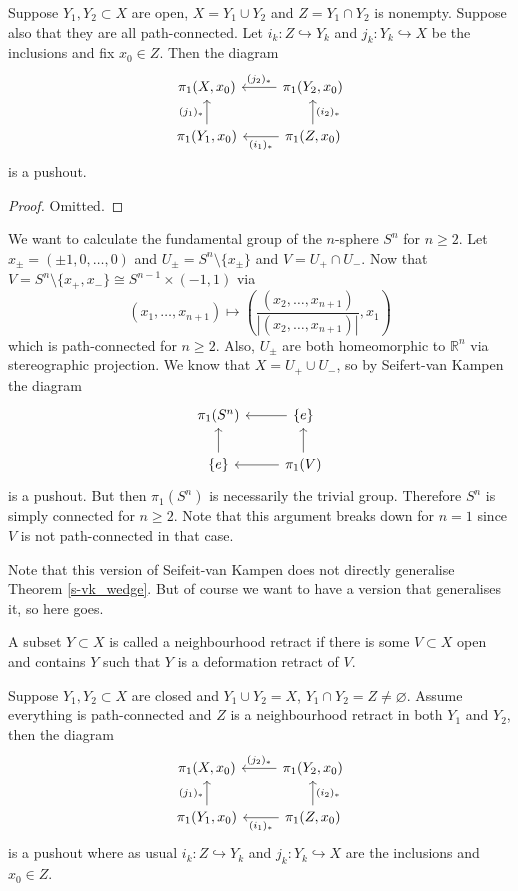 \begin{theorem}\label{s-vk_open}
    Suppose $Y_1,Y_2\subset X$ are open, $X=Y_1\cup Y_2$ and $Z=Y_1\cap Y_2$ is nonempty.
    Suppose also that they are all path-connected.
    Let $i_k:Z\hookrightarrow Y_k$ and $j_k:Y_k\hookrightarrow X$ be the inclusions and fix $x_0\in Z$.
    Then the diagram
    \[
        \begin{tikzcd}
            \pi_1(X,x_0)&\pi_1(Y_2,x_0)\arrow[swap]{l}{(j_2)_\ast}\\
            \pi_1(Y_1,x_0)\arrow{u}{(j_1)_\ast}&\pi_1(Z,x_0)\arrow[swap]{u}{(i_2)_\ast}\arrow{l}{(i_1)_\ast}
        \end{tikzcd}
    \]
    is a pushout.
\end{theorem}
\begin{proof}
    Omitted.
\end{proof}
\begin{example}
    We want to calculate the fundamental group of the $n$-sphere $S^n$ for $n\ge 2$.
    Let $x_\pm=(\pm 1,0,\ldots,0)$ and $U_\pm=S^n\setminus\{x_\pm\}$ and $V=U_+\cap U_-$.
    Now that $V=S^n\setminus\{x_+,x_-\}\cong S^{n-1}\times (-1,1)$ via
    $$(x_1,\ldots,x_{n+1})\mapsto\left( \frac{(x_2,\ldots,x_{n+1})}{|(x_2,\ldots,x_{n+1})|},x_1 \right)$$
    which is path-connected for $n\ge 2$.
    Also, $U_\pm$ are both homeomorphic to $\mathbb R^n$ via stereographic projection.
    We know that $X=U_+\cup U_-$, so by Seifert-van Kampen the diagram
    \[
        \begin{tikzcd}
            \pi_1(S^n)&\{e\}\arrow{l}\\
            \{e\}\arrow{u}&\pi_1(V)\arrow{u}\arrow{l}
        \end{tikzcd}
    \]
    is a pushout.
    But then $\pi_1(S^n)$ is necessarily the trivial group.
    Therefore $S^n$ is simply connected for $n\ge 2$.
    Note that this argument breaks down for $n=1$ since $V$ is not path-connected in that case.
\end{example}
Note that this version of Seifeit-van Kampen does not directly generalise Theorem \ref{s-vk_wedge}.
But of course we want to have a version that generalises it, so here goes.
\begin{definition}
    A subset $Y\subset X$ is called a neighbourhood retract if there is some $V\subset X$ open and contains $Y$ such that $Y$ is a deformation retract of $V$.
\end{definition}
\begin{theorem}\label{s-vk_closed}
    Suppose $Y_1,Y_2\subset X$ are closed and $Y_1\cup Y_2=X$, $Y_1\cap Y_2=Z\neq\varnothing$.
    Assume everything is path-connected and $Z$ is a neighbourhood retract in both $Y_1$ and $Y_2$, then the diagram
    \[
        \begin{tikzcd}
            \pi_1(X,x_0)&\pi_1(Y_2,x_0)\arrow[swap]{l}{(j_2)_\ast}\\
            \pi_1(Y_1,x_0)\arrow{u}{(j_1)_\ast}&\pi_1(Z,x_0)\arrow[swap]{u}{(i_2)_\ast}\arrow{l}{(i_1)_\ast}
        \end{tikzcd}
    \]
    is a pushout where as usual $i_k:Z\hookrightarrow Y_k$ and $j_k:Y_k\hookrightarrow X$ are the inclusions and $x_0\in Z$.
\end{theorem}
